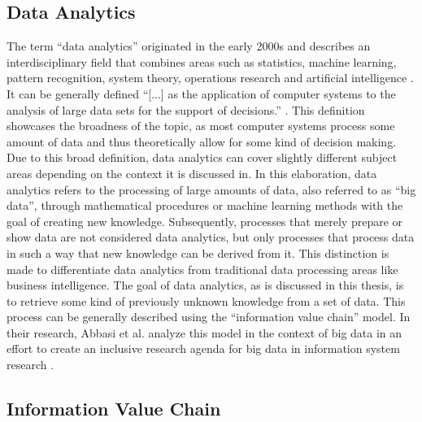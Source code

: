 \subsection{Data Analytics}

The term \enquote{data analytics} originated in the early 2000s and describes an interdisciplinary field that combines areas such as statistics, machine learning, pattern recognition, system theory, operations research and artificial intelligence \parencite{Runkler.2020}. It can be generally defined \enquote{[...] as the application of computer systems to the analysis of large data sets for the support of decisions.} \parencite{Runkler.2020}. This definition showcases the broadness of the topic, as most computer systems process some amount of data and thus theoretically allow for some kind of decision making. Due to this broad definition, data analytics can cover slightly different subject areas depending on the context it is discussed in. In this elaboration, data analytics refers to the processing of large amounts of data, also referred  to as \enquote{big data}, through mathematical procedures or machine learning methods with the goal of creating new knowledge. Subsequently, processes that merely prepare or show data are not considered data analytics, but only processes that process data in such a way that new knowledge can be derived from it. This distinction is made to differentiate data analytics from traditional data processing areas like business intelligence. The goal of data analytics, as is discussed in this thesis, is to retrieve some kind of previously unknown knowledge from a set of data. This process can be generally described using the \enquote{information value chain} model. In their research, Abbasi et al. analyze this model in the context of big data in an effort to create an inclusive research agenda for big data in information system research \parencite{Abbasi.2016}.

\subsection{Information Value Chain}
\label{subsec:informationValueChainSubSection}

